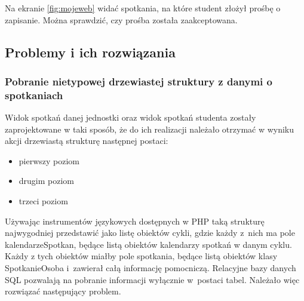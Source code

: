 \documentclass[licencjacka]{pracamgr}
\begin{document}
Na ekranie \ref{fig:mojeweb} widać spotkania, na które student złożył prośbę o zapisanie. Można sprawdzić, czy prośba została zaakceptowana.

\subsection{Problemy i ich rozwiązania}
\subsubsection{Pobranie nietypowej drzewiastej struktury z danymi o spotkaniach}
Widok spotkań danej jednostki oraz widok spotkań studenta zostały zaprojektowane w taki sposób, że do ich realizacji należało otrzymać w wyniku akcji drzewiastą strukturę następnej postaci:

\begin{itemize}
\item{pierwszy poziom}
\item{drugim poziom}
\item{trzeci poziom}
\end{itemize}

Używając instrumentów językowych dostępnych w PHP taką strukturę najwygodniej przedstawić jako listę obiektów cykli, gdzie każdy z~nich ma pole kalendarzeSpotkan, będące listą obiektów kalendarzy spotkań w danym cyklu. Każdy z tych obiektów miałby pole spotkania, będące listą obiektów klasy SpotkanieOsoba i~zawierał całą informację pomocniczą. Relacyjne bazy danych SQL pozwalają na pobranie informacji wyłącznie w~postaci tabel. Należało więc rozwiązać następujący problem.
\end{document}
